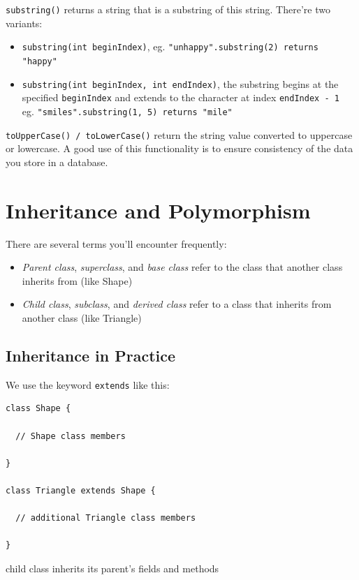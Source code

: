\documentclass[a4paper, 12pt]{article}
\begin{document}
\verb|substring()| returns a string that is a substring of this string. There're two variants:
\begin{itemize}
\item \verb|substring(int beginIndex)|, eg. \verb|"unhappy".substring(2) returns "happy"|

\item \verb|substring(int beginIndex, int endIndex)|, the substring begins at the specified \verb|beginIndex| and extends to the character at index \verb|endIndex - 1|\\ eg. \verb|"smiles".substring(1, 5) returns "mile"|

\end{itemize}

\verb|toUpperCase() / toLowerCase()| return the string value converted to uppercase or lowercase. A good use of this functionality is to ensure consistency of the data you store in a database.


\section{Inheritance and Polymorphism}
There are several terms you'll encounter frequently:
\begin{itemize}
\item \textit{Parent class}, \textit{superclass}, and \textit{base class} refer to the class that another class inherits from (like Shape)

\item \textit{Child class}, \textit{subclass}, and \textit{derived class} refer to a class that inherits from another class (like Triangle)

\end{itemize}

\subsection{Inheritance in Practice}
We use the keyword \verb|extends| like this:
\begin{verbatim}
class Shape {

  // Shape class members

}

class Triangle extends Shape {

  // additional Triangle class members

}
\end{verbatim}

child class inherits its parent's fields and methods
\end{document}
